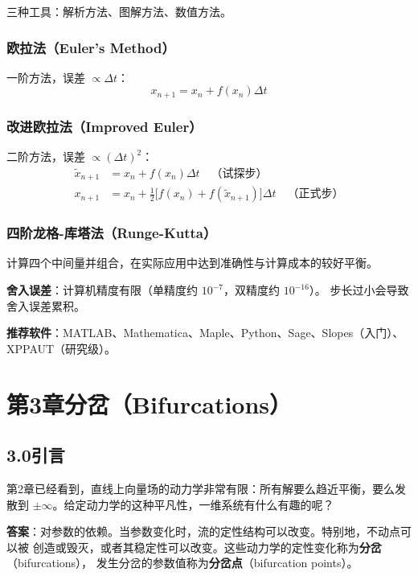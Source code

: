 \documentclass[12pt,a4paper]{article}
\begin{document}
三种工具：解析方法、图解方法、数值方法。

\subsubsection{欧拉法（Euler's Method）}
一阶方法，误差 $\propto \Delta t$：
\begin{equation}
x_{n+1} = x_n + f(x_n)\Delta t
\end{equation}

\subsubsection{改进欧拉法（Improved Euler）}
二阶方法，误差 $\propto (\Delta t)^2$：
\begin{align}
\tilde{x}_{n+1} &= x_n + f(x_n)\Delta t \quad\text{（试探步）} \\
x_{n+1} &= x_n + \frac{1}{2}\bigl[f(x_n) + f(\tilde{x}_{n+1})\bigr]\Delta t \quad\text{（正式步）}
\end{align}

\subsubsection{四阶龙格-库塔法（Runge-Kutta）}
计算四个中间量并组合，在实际应用中达到准确性与计算成本的较好平衡。

\textbf{舍入误差}：计算机精度有限（单精度约 $10^{-7}$，双精度约 $10^{-16}$）。
步长过小会导致舍入误差累积。

\textbf{推荐软件}：MATLAB、Mathematica、Maple、Python、Sage、Slopes（入门）、
XPPAUT（研究级）。

\section{第3章\quad 分岔（Bifurcations）}

\subsection{3.0\quad 引言}

第2章已经看到，直线上向量场的动力学非常有限：所有解要么趋近平衡，要么发散到
$\pm\infty$。给定动力学的这种平凡性，一维系统有什么有趣的呢？

\textbf{答案}：对参数的依赖。当参数变化时，流的定性结构可以改变。特别地，不动点可以被
创造或毁灭，或者其稳定性可以改变。这些动力学的定性变化称为\textbf{分岔}（bifurcations），
发生分岔的参数值称为\textbf{分岔点}（bifurcation points）。
\end{document}
